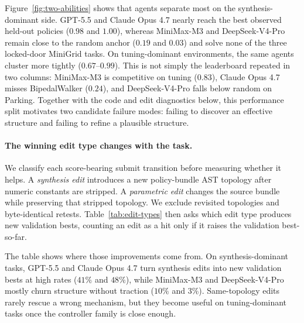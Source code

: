 Figure~\ref{fig:two-abilities} shows that agents separate most on the
synthesis-dominant side. GPT-5.5 and Claude Opus 4.7 nearly reach the best
observed held-out policies ($0.98$ and $1.00$), whereas MiniMax-M3 and
DeepSeek-V4-Pro remain close to the random anchor ($0.19$ and $0.03$) and solve
none of the three locked-door MiniGrid tasks. On tuning-dominant environments,
the same agents cluster more tightly ($0.67$--$0.99$). This is not simply the
leaderboard repeated in two columns: MiniMax-M3 is competitive on tuning
($0.83$), Claude Opus 4.7 misses BipedalWalker ($0.24$), and DeepSeek-V4-Pro
falls below random on Parking. Together with the code and edit diagnostics below, this performance split motivates two candidate failure modes: failing to discover an effective structure and failing to refine a plausible structure.

\paragraph{The winning edit type changes with the task.}
We classify each score-bearing submit transition before measuring whether it
helps. A \emph{synthesis edit} introduces a new policy-bundle AST topology
after numeric constants are stripped. A \emph{parametric edit} changes the
source bundle while preserving that stripped topology. We exclude revisited
topologies and byte-identical retests. %
Table~\ref{tab:edit-types}  then asks which edit type produces new validation bests, counting an edit as a hit only
if it raises the validation best-so-far.



The table shows where those improvements come from. On synthesis-dominant
tasks, GPT-5.5 and Claude Opus 4.7 turn synthesis edits into new validation
bests at high rates ($41\%$ and $48\%$), while MiniMax-M3 and
DeepSeek-V4-Pro mostly churn structure without traction ($10\%$ and $3\%$).
Same-topology edits rarely rescue a wrong mechanism, but they become useful on
tuning-dominant tasks once the controller family is close enough.


